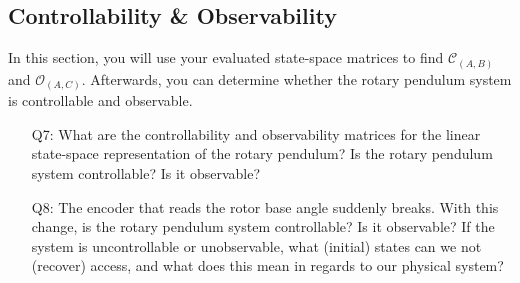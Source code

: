 \documentclass[12pt]{report}
\newcommand\drew[1]{\textcolor{red}{#1}}
\begin{document}
\subsection{Controllability \& Observability}\label{subsection:lab2_math_approach}
In this section, you will use your evaluated state-space matrices to find $\mathcal{C}_{(A,B)}$ and $\mathcal{O}_{(A,C)}$. Afterwards, you can determine whether the rotary pendulum system is controllable and observable.
\begin{enumerate}[Question]
    \item[Q7:] What are the controllability and observability matrices for the linear state-space representation of the rotary pendulum? Is the rotary pendulum system controllable? Is it observable?\\
    \item[Q8:] The encoder that reads the rotor base angle suddenly breaks. With this change, is the rotary pendulum system controllable? Is it observable? If the system is uncontrollable or unobservable, what (initial) states can we not (recover) access, and what does this mean in regards to our physical system?\\

\end{enumerate}
\end{document}
